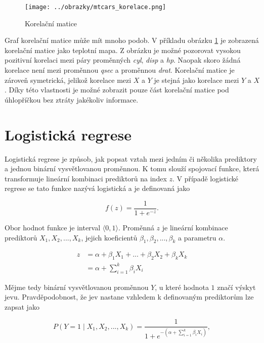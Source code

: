 \begin{figure}[H]
    \centering
    \texttt{[image: ../obrazky/mtcars\_korelace.png]}
    \caption{Korelační matice} 
    \label{fig:mtcars_korelace}
\end{figure}

Graf korelační matice může mít mnoho podob. V příkladu obrázku \ref{fig:mtcars_korelace} je zobrazená korelační matice jako teplotní mapa. Z obrázku je možné pozorovat vysokou
pozitivní korelaci mezi páry proměnných \textit{cyl}, \textit{disp} a \textit{hp}. Naopak skoro žádná korelace není mezi proměnnou \textit{qsec} a proměnnou \textit{drat}.
Korelační matice je zároveň symetrická, jelikož korelace mezi $X$ a $Y$ je stejná jako korelace mezi $Y$ a $X$. Díky této vlastnosti je možné zobrazit pouze část 
korelační matice pod úhlopříčkou bez ztráty jakékoliv informace.

\newpage
\section{Logistická regrese}
Logistická regrese je způsob, jak popsat vztah mezi jedním či několika prediktory a jednou binární vysvětlovanou 
proměnnou. K tomu slouží spojovací funkce, která transformuje lineární kombinaci prediktorů na index $z$. V případě
logistické regrese se tato funkce nazývá logistická a je definovaná jako

\begin{equation}
    \label{eq:logisticka_funkce}
    f(z) = \frac{1}{1 + e^{-z}}.
\end{equation}

Obor hodnot funkce je interval $\langle 0, 1 \rangle$. Proměnná $z$ je lineární kombinace prediktorů  $X_1, X_2, ..., X_k$, 
jejich koeficientů $\beta_1, \beta_2, ..., \beta_k$ a parametru $\alpha$.

\begin{equation*}
    \label{eq:linearni_kombinace_z}
    \begin{split}
        z &= \alpha + \beta_1 X_1 + ... + \beta_2 X_2 +\beta_k X_k \\
          &= \alpha + \sum_{i=1}^k \beta_i X_i
    \end{split}
\end{equation*}

Mějme tedy binární vysvětlovanou proměnnou $Y$, u které hodnota $1$ značí výskyt jevu. Pravděpodobnost, že jev nastane
vzhledem k definovaným prediktorům lze zapsat jako

\begin{equation}
    \label{eq:pravdepodobnost_y}
    P(Y = 1 \mid X_1, X_2, ..., X_k) = \frac{1}{1 + e^{- \left( \alpha + \sum_{i=1}^k \beta_i X_i \right) }},
\end{equation}

